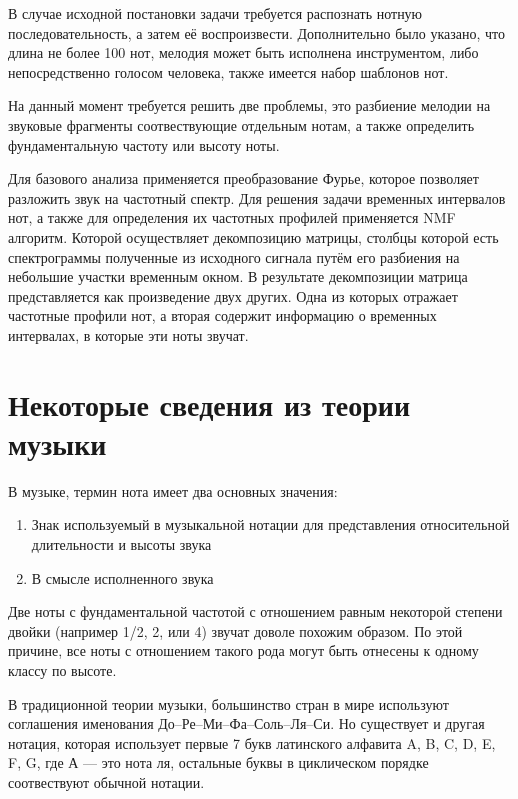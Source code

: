 \documentclass[oneside, final, 12pt]{extarticle}
\begin{document}
  В случае исходной постановки задачи требуется распознать нотную
  последовательность, а затем её воспроизвести. Дополнительно было указано,
  что длина не более 100 нот, мелодия может быть исполнена инструментом, либо
  непосредственно голосом человека, также имеется набор шаблонов нот.

  На данный момент требуется решить две проблемы, это разбиение мелодии на
  звуковые фрагменты соотвествующие отдельным нотам, а также определить
  фундаментальную частоту или высоту ноты.

  Для базового анализа применяется преобразование Фурье, которое позволяет
  разложить звук на частотный спектр. Для решения задачи временных
  интервалов нот, а также для определения их частотных профилей
  применяется NMF алгоритм. Которой осуществляет декомпозицию
  матрицы, столбцы которой есть спектрограммы полученные из исходного
  сигнала путём его разбиения на небольшие участки временным окном.
  В результате декомпозиции матрица представляется как произведение
  двух других. Одна из которых отражает частотные профили нот, а вторая
  содержит информацию о временных интервалах, в которые эти ноты звучат.

\cleardoublepage

\section{Некоторые сведения из теории музыки}

  В музыке, термин нота имеет два основных значения:

  \begin{enumerate}
    \item Знак используемый в музыкальной нотации для представления
      относительной длительности и высоты звука
    \item В смысле исполненного звука
  \end{enumerate}

  Две ноты с фундаментальной частотой с отношением равным некоторой
  степени двойки (например 1/2, 2, или 4) звучат доволе похожим
  образом. По этой причине, все ноты с отношением такого рода могут
  быть отнесены к одному классу по высоте.

  В традиционной теории музыки, большинство стран в мире используют
  соглашения именования До--Ре--Ми--Фа--Соль--Ля--Си. Но существует
  и другая нотация, которая использует первые 7 букв латинского
  алфавита A, B, C, D, E, F, G, где А --- это нота ля, остальные
  буквы в циклическом порядке соотвествуют обычной нотации.
\end{document}
